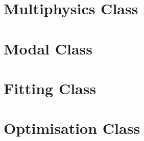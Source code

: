 \section{Multiphysics Class}



\section{Modal Class}
\clearpage

\section{Fitting Class}
\clearpage
%

\section{Optimisation Class}
\clearpage
